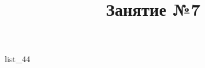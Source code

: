 \documentclass[12pt, a4paper]{article}
\begin{document}
	\title{Занятие №7}
	{list_44}
\end{document}
